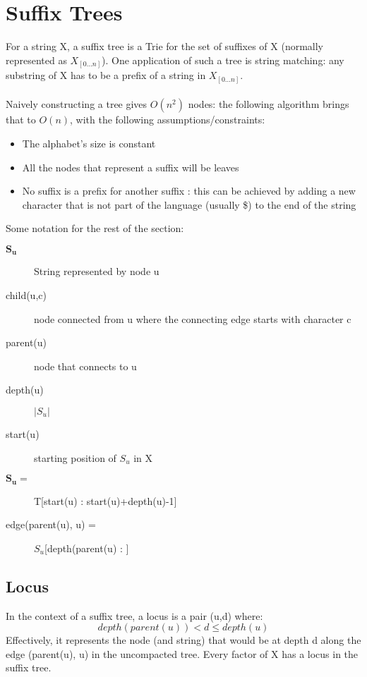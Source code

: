 \section{Suffix Trees}
For a string X, a suffix tree is a Trie for the set of suffixes of X (normally represented as $X_{[0\dots n]}$). One application of such a tree is string matching: any substring of X has to be a prefix of a string in $X_{[0\dots n]}$. \\ \\
Naively constructing a tree gives $O(n^2)$ nodes: the following algorithm brings that to $O(n)$, with the following assumptions/constraints:
\begin{itemize}
    \item The alphabet's size is constant
    \item All the nodes that represent a suffix will be leaves
    \item No suffix is a prefix for another suffix : this can be achieved by adding a new character that is not part of the language (usually \$) to the end of the string \\
\end{itemize}
Some notation for the rest of the section:
\begin{description}
    \item [$\boldsymbol{S_u}$] String represented by node u
    \item [child(u,c)] node connected from u where the connecting edge starts with character c
    \item [parent(u)] node that connects to u
    \item [depth(u)] $|S_u|$
    \item [start(u)] starting position of $S_u$ in X
    \item[$\boldsymbol{S_u} =$] T[start(u) : start(u)+depth(u)-1]
    \item [edge(parent(u), u) = ] $S_u$[depth(parent(u) : ] 
\end{description}

\subsection{Locus}
In the context of a suffix tree, a locus is a pair (u,d) where: 
\begin{equation}
    depth(parent(u)) < d \leq depth(u) \nonumber
\end{equation}
Effectively, it represents the node (and string) that would be at depth d along the edge (parent(u), u) in the uncompacted tree. Every factor of X has a locus in the suffix tree.

